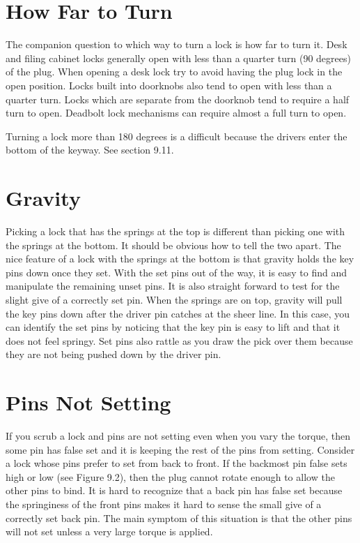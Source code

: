 \section{How Far to Turn}
The companion question to which way to turn a lock is how far to turn it. Desk and filing 
cabinet locks generally open with less than a quarter turn (90 degrees) of the plug. When 
opening a desk lock try to avoid having the plug lock in the open position. Locks built into 
doorknobs also tend to open with less than a quarter turn. Locks which are separate from 
the doorknob tend to require a half turn to open. Deadbolt lock mechanisms can require 
almost a full turn to open. 

Turning a lock more than 180 degrees is a difficult because the drivers enter the bottom 
of the keyway. See section 9.11.

\section{Gravity}
Picking a lock that has the springs at the top is different than picking one with the springs 
at the bottom. It should be obvious how to tell the two apart. The nice feature of a lock 
with the springs at the bottom is that gravity holds the key pins down once they set. With 
the set pins out of the way, it is easy to find and manipulate the remaining unset pins. It is 
also straight forward to test for the slight give of a correctly set pin. When the springs are 
on top, gravity will pull the key pins down after the driver pin catches at the sheer line. In 
this case, you can identify the set pins by noticing that the key pin is easy to lift and that it 
does not feel springy. Set pins also rattle as you draw the pick over them because they are 
not being pushed down by the driver pin.

\section{Pins Not Setting}
If you scrub a lock and pins are not setting even when you vary the torque, then some pin 
has false set and it is keeping the rest of the pins from setting. Consider a lock whose pins 
prefer to set from back to front. If the backmost pin false sets high or low (see Figure 9.2), 
then the plug cannot rotate enough to allow the other pins to bind. It is hard to recognize 
that a back pin has false set because the springiness of the front pins makes it hard to sense 
the small give of a correctly set back pin. The main symptom of this situation is that the 
other pins will not set unless a very large torque is applied. 

